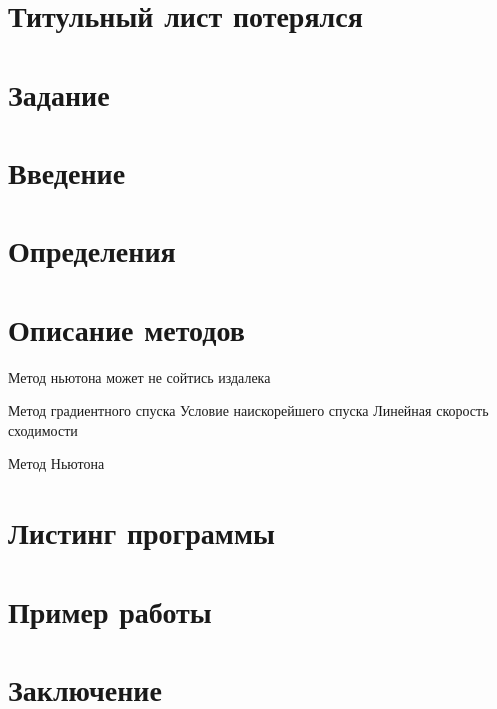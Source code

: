 \documentclass[a4paper, 12pt]{report}
\begin{document}
\section*{Титульный лист потерялся}
\newpage
\section*{Задание}
\newpage
\tableofcontents
\newpage
\section*{Введение}
\newpage
\section*{Определения}
\newpage
\section*{Описание методов}
Метод ньютона может не сойтись издалека

Метод градиентного спуска
Условие наискорейшего спуска
Линейная скорость сходимости

Метод Ньютона
\newpage
\section*{Листинг программы}
\newpage
\section*{Пример работы}
\newpage
\section*{Заключение}
\newpage
\end{document}
